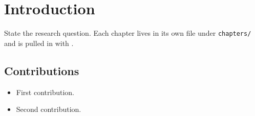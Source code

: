 \chapter{Introduction}\label{ch:intro}
State the research question. Each chapter lives in its own file under
\texttt{chapters/} and is pulled in with \verb||.

\section{Contributions}
\begin{itemize}
  \item First contribution.
  \item Second contribution.
\end{itemize}
